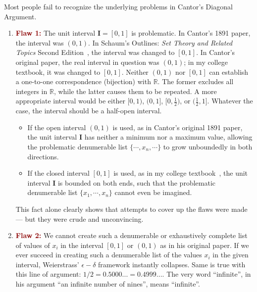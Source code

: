 \documentclass[12pt]{article}
\theoremstyle{definition} %
\numberwithin{equation}{section}
\newcommand{\boldred}[2]			   
{\textbf{\textcolor{darkred}{#1 #2}}}
\begin{document}
Most people fail to recognize the underlying problems in Cantor’s Diagonal Argument. 

\begin{enumerate}
\item \boldred{Flaw}{1:} The unit interval \(\bm{I} = \left[0, 1\right]\) is problematic. In Cantor's 1891 paper, the interval was \(\left(0, 1\right)\). In Schaum's Outlines: \textit{Set Theory and Related Topics} Second Edition~\cite{lipschutz1998}, the interval was changed to \(\left[0, 1\right]\). In Cantor's original paper, the real interval in question was \( (0,1) \); in my college textbook, it was changed to \( [0,1] \). Neither \( (0,1) \) nor \( [0,1] \) can establish a one-to-one correspondence (bijection) with \( \mathbb{R} \). The former excludes all integers in \( \mathbb{R} \), while the latter causes them to be repeated. A more appropriate interval would be either \( [0,1) \), \( (0,1] \), \( [0, \frac{1}{2}) \), or \( (\frac{1}{2},1] \). Whatever the case, the interval should be a half-open interval.

\begin{itemize}
\item If the open interval \(\left(0, 1\right)\) is used, as in Cantor's original 1891 paper, the unit interval \(\bm{I}\) has neither a minimum nor a maximum value, allowing the problematic denumerable list \(\{\cdots, x_n, \cdots \}\) to grow unboundedly in both directions.

\item If the closed interval \(\left[0, 1\right]\) is used, as in my college textbook~\cite{lipschutz1998}, the unit interval \(\bm{I}\) is bounded on both ends, such that the problematic denumerable list \(\{x_1, \cdots, x_n \}\) cannot even be imagined.

\end{itemize}

This fact alone clearly shows that attempts to cover up the flaws were made — but they were crude and unconvincing.

\item \boldred{Flaw}{2:} We cannot create such a denumerable or exhaustively complete list of values of \(x_i\) in the interval \([0,1]\) or \((0,1)\) as in his original paper. If we ever succeed in creating such a denumerable list of the values \(x_i\) in the given interval, Weierstrass' \(\epsilon-\delta\) framework instantly collapses. Same is true with this line of argument: \(1/2 = 0.5000... = 0.4999...\). The very word ``infinite'',  in his argument ``an infinite number of nines'', means ``infinite''. 


\end{enumerate}
\end{document}
